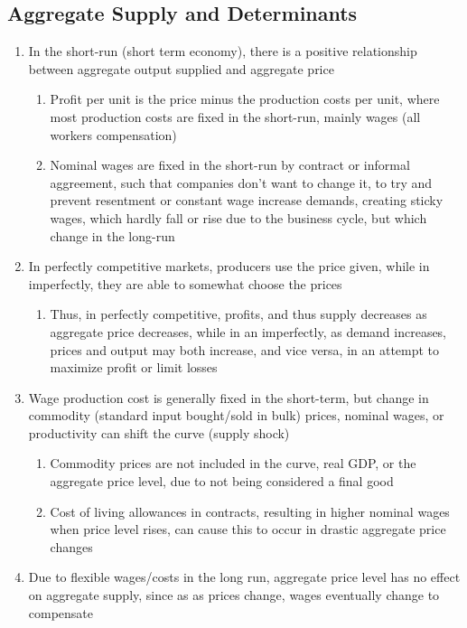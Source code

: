 \subsection{Aggregate Supply and Determinants}
\begin{enumerate}
\item In the short-run (short term economy), there is a positive relationship between aggregate output supplied and aggregate price
\begin{enumerate}
\item Profit per unit is the price minus the production costs per unit, where most production costs are fixed in the short-run, mainly wages (all workers compensation)
\item Nominal wages are fixed in the short-run by contract or informal aggreement, such that companies don't want to change it, to try and prevent resentment or constant wage increase demands, creating sticky wages, which hardly fall or rise due to the business cycle, but which change in the long-run
\end{enumerate}
\item In perfectly competitive markets, producers use the price given, while in imperfectly, they are able to somewhat choose the prices
\begin{enumerate}
\item Thus, in perfectly competitive, profits, and thus supply decreases as aggregate price decreases, while in an imperfectly, as demand increases, prices and output may both increase, and vice versa, in an attempt to maximize profit or limit losses 
\end{enumerate}
\item Wage production cost is generally fixed in the short-term, but change in commodity (standard input bought/sold in bulk) prices, nominal wages, or productivity can shift the curve (supply shock)
\begin{enumerate}
\item Commodity prices are not included in the curve, real GDP, or the aggregate price level, due to not being considered a final good
\item Cost of living allowances in contracts, resulting in higher nominal wages when price level rises, can cause this to occur in drastic aggregate price changes
\end{enumerate}
\item Due to flexible wages/costs in the long run, aggregate price level has no effect on aggregate supply, since as as prices change, wages eventually change to compensate

\end{enumerate}
